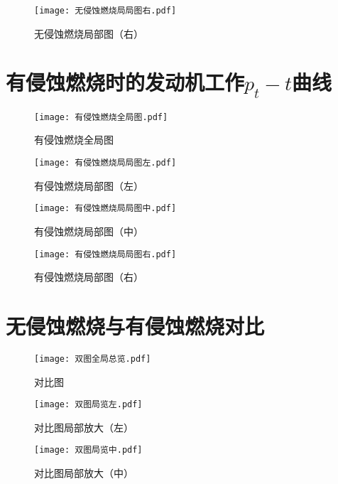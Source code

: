   \begin{figure}[!h]
    \centering
    \texttt{[image: 无侵蚀燃烧局局图右.pdf]}
    \caption{无侵蚀燃烧局部图（右）}
    \label{fig:example}
  \end{figure}

\section{有侵蚀燃烧时的发动机工作$p_{t}-t$曲线}

\begin{figure}[H]
    \centering
    \texttt{[image: 有侵蚀燃烧全局图.pdf]}
    \caption{有侵蚀燃烧全局图}
    \label{fig:example}
  \end{figure}

\begin{figure}[!h]
    \centering
    \texttt{[image: 有侵蚀燃烧局局图左.pdf]}
    \caption{有侵蚀燃烧局部图（左）}
    \label{fig:example}
  \end{figure}

\begin{figure}[!h]
    \centering
    \texttt{[image: 有侵蚀燃烧局局图中.pdf]}
    \caption{有侵蚀燃烧局部图（中）}
    \label{fig:example}
  \end{figure}

  \begin{figure}[!h]
    \centering
    \texttt{[image: 有侵蚀燃烧局局图右.pdf]}
    \caption{有侵蚀燃烧局部图（右）}
    \label{fig:example}
  \end{figure}

\section{无侵蚀燃烧与有侵蚀燃烧对比}
\begin{figure}[H]
    \centering
    \texttt{[image: 双图全局总览.pdf]}
    \caption{对比图}
    \label{fig:example}
  \end{figure}

\begin{figure}[!h]
    \centering
    \texttt{[image: 双图局览左.pdf]}
    \caption{对比图局部放大（左）}
    \label{fig:example}
  \end{figure}

\begin{figure}[!h]
    \centering
    \texttt{[image: 双图局览中.pdf]}
    \caption{对比图局部放大（中）}
    \label{fig:example}
  \end{figure}


